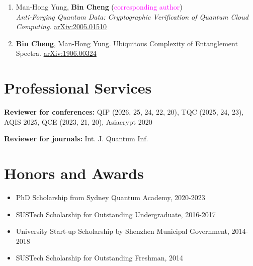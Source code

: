 \documentclass[margin,line,a4paper]{resume}
\newcommand{\magenta}[1]{\textcolor{magenta}{#1}}
\begin{document}
\begin{resume}
\begin{enumerate}
	\item Man-Hong Yung, \textbf{Bin Cheng} (\magenta{corresponding author}) \\
    \emph{Anti-Forging Quantum Data: Cryptographic Verification of Quantum Cloud Computing}.  \href{https://arxiv.org/abs/2005.01510}{arXiv:2005.01510}

	\item \textbf{Bin Cheng}, Man-Hong Yung. Ubiquitous Complexity of Entanglement Spectra.  \href{https://arxiv.org/abs/1906.00324}{arXiv:1906.00324}
      
\end{enumerate}








\section{\mysidestyle Professional Services}\vspace{1mm}

\textbf{Reviewer for conferences:} QIP (2026, 25, 24, 22, 20), TQC (2025, 24, 23), AQIS 2025, QCE (2023, 21, 20), Asiacrypt 2020

\textbf{Reviewer for journals:} Int. J. Quantum Inf.

\section{\mysidestyle Honors and Awards}\vspace{1mm}

\begin{itemize}
    \item PhD Scholarship from Sydney Quantum Academy, 2020-2023
    \item SUSTech Scholarship for Outstanding Undergraduate, 2016-2017
    \item University Start-up Scholarship by Shenzhen Municipal Government, 2014-2018
    \item SUSTech Scholarship for Outstanding Freshman, 2014
\end{itemize}


\end{resume}
\end{document}
